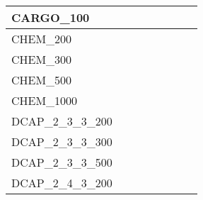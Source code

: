 \begin{table}[H]
{\begin{tabular}{|l|ll|ll|l|l|l|}
			CARGO\_100                     &                                 &                                &                                  &                                 &                                    &                            &                            \\ \hline
			CHEM\_200                      &                                 &                                &                                  &                                 &                                    &                            &                            \\
			CHEM\_300                      &                                 &                                &                                  &                                 &                                    &                            &                            \\
			CHEM\_500                      &                                 &                                &                                  &                                 &                                    &                            &                            \\
			CHEM\_1000                     &                                 &                                &                                  &                                 &                                    &                            &                            \\ \hline
			DCAP\_2\_3\_3\_200             &                                 &                                &                                  &                                 &                                    &                            &                            \\
			DCAP\_2\_3\_3\_300             &                                 &                                &                                  &                                 &                                    &                            &                            \\
			DCAP\_2\_3\_3\_500             &                                 &                                &                                  &                                 &                                    &                            &                            \\
			DCAP\_2\_4\_3\_200             &                                 &                                &                                  &                                 &                                    &                            &                            \\

\end{tabular}}
\end{table}
